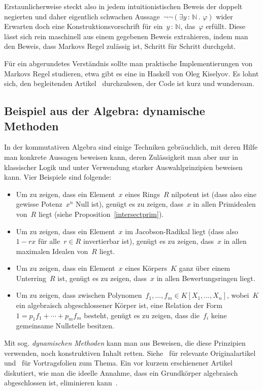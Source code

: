 \documentclass[a4paper,ngerman,12pt]{scrartcl}
\theoremstyle{definition}
\theoremstyle{plain}
\theoremstyle{remark}
\newcommand{\NN}{\mathbb{N}}
\renewcommand{\_}{\mathpunct{.}\,}
\newcommand{\?}{\,{:}\,}
\begin{document}
Erstaunlicherweise steckt also in jedem intuitionistischen Beweis der doppelt
negierten und daher eigentlich schwachen Aussage~$\neg\neg(\exists y\?\NN\_ \varphi)$
wider Erwarten doch eine Konstruktionsvorschrift für ein~$y\?\NN$, das~$\varphi$
erfüllt. Diese lässt sich rein maschinell aus einem gegebenen Beweis extrahieren, indem man
den Beweis, dass Markovs Regel zulässig ist, Schritt für Schritt durchgeht.

Für ein abgerundetes Verständnis sollte man praktische Implementierungen von
Markovs Regel studieren, etwa gibt es eine in Haskell von Oleg Kiselyov.
Es lohnt sich, den begleitenden Artikel~\cite{kiselyov:lem} durchzulesen,
der Code ist kurz und wundersam.


\subsection{Beispiel aus der Algebra: dynamische Methoden}

In der kommutativen Algebra sind einige Techniken gebräuchlich, mit deren Hilfe
man konkrete Aussagen beweisen kann, deren Zulässigkeit man aber nur
in klassischer Logik und unter Verwendung starker Auswahlprinzipien beweisen
kann. Vier Beispiele sind folgende:

\begin{itemize}
\item Um zu zeigen, dass ein Element~$x$ eines Rings~$R$ nilpotent ist (dass
also eine gewisse Potenz~$x^n$ Null ist), genügt es zu zeigen, dass~$x$ in
allen Primidealen von~$R$ liegt (siehe Proposition~\ref{intersectprim}).
\item Um zu zeigen, dass ein Element~$x$ im Jacobson-Radikal liegt (dass
also~$1-rx$ für alle~$r \in R$ invertierbar ist), genügt es zu zeigen, dass~$x$
in allen maximalen Idealen von~$R$ liegt.
\item Um zu zeigen, dass ein Element~$x$ eines Körpers~$K$ ganz über einem
Unterring~$R$ ist, genügt es zu zeigen, dass~$x$ in allen Bewertungsringen
liegt.
\item Um zu zeigen, dass zwischen Polynomen~$f_1,\ldots,f_m \in
K[X_1,\ldots,X_n]$, wobei~$K$ ein algebraisch abgeschlossener Körper ist, eine
Relation der Form~$1 = p_1 f_1 + \cdots + p_m f_m$ besteht, genügt es zu
zeigen, dass die~$f_i$ keine gemeinsame Nullstelle besitzen.
\end{itemize}

Mit sog. \emph{dynamischen Methoden} kann man aus Beweisen, die diese
Prinzipien verwenden, noch konstruktiven Inhalt retten.
Siehe~\cite{clr:dynamicalmethod,cl:logical} für relevante Originalartikel
und~\cite{coquand:sitesur,lombardi:hilbertworks} für Vortragsfolien zum Thema.
Ein vor kurzem erschienener Artikel diskutiert, wie man die ideelle Annahme,
dass ein Grundkörper algebraisch abgeschlossen ist, eliminieren
kann~\cite{mannaa:coquand:alg-closure}.
\end{document}
